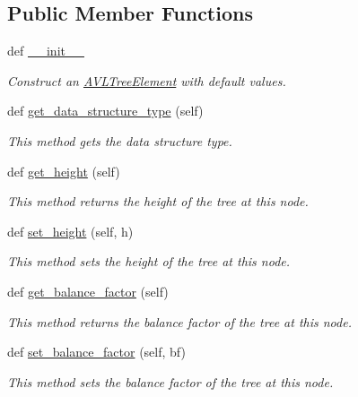 \subsection*{Public Member Functions}
\begin{DoxyCompactItemize}
\item 
def \hyperlink{class_a_v_l_tree_element_1_1_a_v_l_tree_element_a696c8654b851172b6918728a3e47631c}{\+\_\+\+\_\+init\+\_\+\+\_\+}
\begin{DoxyCompactList}\small\item\em Construct an \hyperlink{class_a_v_l_tree_element_1_1_a_v_l_tree_element}{A\+V\+L\+Tree\+Element} with default values. \end{DoxyCompactList}\item 
def \hyperlink{class_a_v_l_tree_element_1_1_a_v_l_tree_element_af1dd46ba9ec315666b049ae3647d6f28}{get\+\_\+data\+\_\+structure\+\_\+type} (self)
\begin{DoxyCompactList}\small\item\em This method gets the data structure type. \end{DoxyCompactList}\item 
def \hyperlink{class_a_v_l_tree_element_1_1_a_v_l_tree_element_ac2feaad2712bc0a592e02e14c775e987}{get\+\_\+height} (self)
\begin{DoxyCompactList}\small\item\em This method returns the height of the tree at this node. \end{DoxyCompactList}\item 
def \hyperlink{class_a_v_l_tree_element_1_1_a_v_l_tree_element_af61b40eaf63816f7737fb4da69d6d6b0}{set\+\_\+height} (self, h)
\begin{DoxyCompactList}\small\item\em This method sets the height of the tree at this node. \end{DoxyCompactList}\item 
def \hyperlink{class_a_v_l_tree_element_1_1_a_v_l_tree_element_ac4d2c2c91b8b44f7af1699f3d0e498a2}{get\+\_\+balance\+\_\+factor} (self)
\begin{DoxyCompactList}\small\item\em This method returns the balance factor of the tree at this node. \end{DoxyCompactList}\item 
def \hyperlink{class_a_v_l_tree_element_1_1_a_v_l_tree_element_ae57a5a7dd74ddf0b15e281e9cfdb6192}{set\+\_\+balance\+\_\+factor} (self, bf)
\begin{DoxyCompactList}\small\item\em This method sets the balance factor of the tree at this node. \end{DoxyCompactList}\item 

\end{DoxyCompactItemize}
